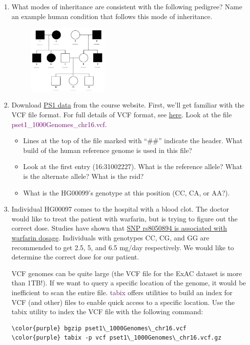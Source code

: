 \documentclass[12pt]{article}
\begin{document}
\begin{enumerate}
\item What modes of inheritance are consistent with the following pedigree? Name an example human condition that follows this mode of inheritance.

\begin{figure}[h!]
\centering
\includegraphics[width=150px]{pset1dominant.png}
\end{figure}

\item Download \href{https://gymreklab.github.io/teaching/personal\_genomics/ps1\_introduction.html}{PS1 data} from the course website. First, we'll get familiar with the VCF file format. For full details of VCF format, see \href{https://samtools.github.io/hts-specs/VCFv4.2.pdf}{here}. Look at the file \textcolor{purple}{pset1\_1000Genomes\_chr16.vcf}.
\begin{itemize}
\item Lines at the top of the file marked with ``\#\#'' indicate the header. What build of the human reference genome is used in this file?
\item Look at the first entry (16:31002227). What is the reference allele? What is the alternate allele? What is the rsid?
\item What is the HG00099's genotype at this position (CC, CA, or AA?).
\end{itemize}

\item Individual HG00097 comes to the hospital with a blood clot. The doctor would like to treat the patient with warfarin, but is trying to figure out the correct dose. Studies have shown that \href{https://www.snpedia.com/index.php/Rs8050894}{SNP rs8050894 is associated with warfarin dosage}. Individuals with genotypes CC, CG, and GG are recommended to get 2.5, 5, and 6.5 mg/day respectively. We would like to determine the correct dose for our patient.

VCF genomes can be quite large (the VCF file for the ExAC dataset is more than 1TB!). If we want to query a specific location of the genome, it would be inefficient to scan the entire file. \textcolor{purple}{tabix} offers utilities to build an index for VCF (and other) files to enable quick access to a specific location. Use the tabix utility to index the VCF file with the following command:
\begin{Verbatim}[commandchars=\\\{\}]
\color{purple} bgzip pset1\_1000Genomes\_chr16.vcf
\color{purple} tabix -p vcf pset1\_1000Genomes\_chr16.vcf.gz
\end{Verbatim}


\end{enumerate}
\end{document}
